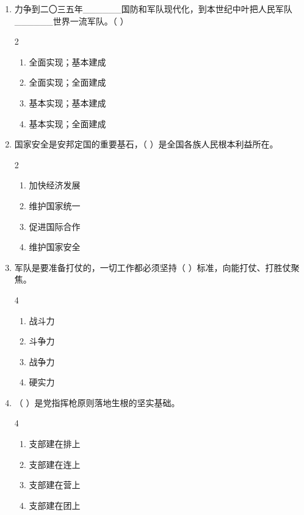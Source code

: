 \documentclass[a4paper,11pt]{ctexart}
\begin{document}
\begin{enumerate}
    \item 力争到二〇三五年\_\_\_\_\_\_国防和军队现代化，到本世纪中叶把人民军队\_\_\_\_\_\_世界一流军队。（ ）
    \begin{multicols}{2}
    \begin{enumerate}
        \item 全面实现；基本建成
        \item 全面实现；全面建成
        \item 基本实现；基本建成
        \item 基本实现；全面建成
    \end{enumerate}
    \end{multicols}

    \item 国家安全是安邦定国的重要基石，（ ）是全国各族人民根本利益所在。
    \begin{multicols}{2}
    \begin{enumerate}
        \item 加快经济发展
        \item 维护国家统一
        \item 促进国际合作
        \item 维护国家安全
    \end{enumerate}
    \end{multicols}

    \item 军队是要准备打仗的，一切工作都必须坚持（ ）标准，向能打仗、打胜仗聚焦。
    \begin{multicols}{4}
    \begin{enumerate}
        \item 战斗力
        \item 斗争力
        \item 战争力
        \item 硬实力
    \end{enumerate}
    \end{multicols}

    \item （ ）是党指挥枪原则落地生根的坚实基础。
    \begin{multicols}{4}
    \begin{enumerate}
        \item 支部建在排上
        \item 支部建在连上
        \item 支部建在营上
        \item 支部建在团上
    \end{enumerate}
    \end{multicols}


\end{enumerate}
\end{document}
